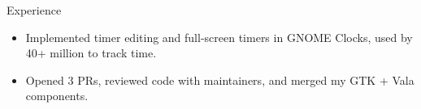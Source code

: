 \documentclass{resume} %
\begin{document}
\begin{workSection}{Experience}
\begin{itemize}
		\item Implemented timer editing and full-screen timers in GNOME Clocks, used by 40+ million to track time.
		\item Opened 3 PRs, reviewed code with maintainers, and merged my GTK + Vala components.
	\end{itemize}
	

\end{workSection}
\end{document}
